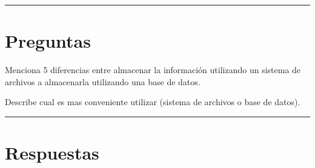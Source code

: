 \documentclass{exam}
\begin{document}
\noindent
\rule[2ex]{\textwidth}{2pt}

\section*{Preguntas}

\begin{questions}
	\question Menciona 5 diferencias entre almacenar la información utilizando un sistema de archivos a almacenarla utilizando una base de datos.

	
	\question Describe cual es mas conveniente utilizar (sistema de archivos o base de datos).
\end{questions}

\noindent
\rule[2ex]{\textwidth}{2pt}

\section*{Respuestas}
\end{document}
